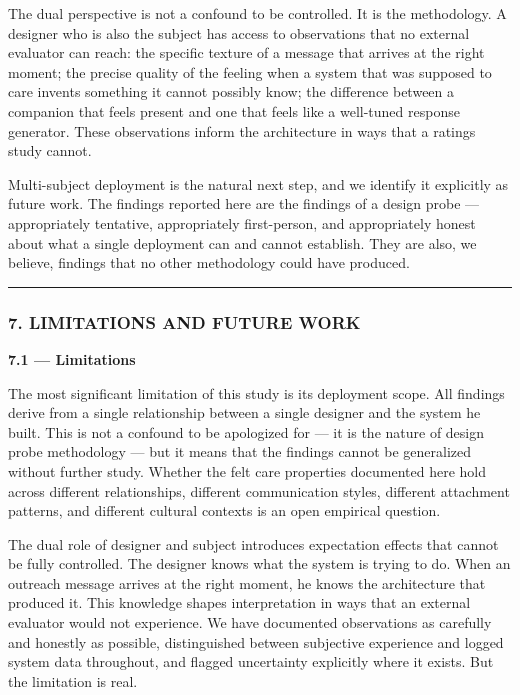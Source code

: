 The dual perspective is not a confound to be controlled. It is the
methodology. A designer who is also the subject has access to
observations that no external evaluator can reach: the specific texture
of a message that arrives at the right moment; the precise quality of
the feeling when a system that was supposed to care invents something it
cannot possibly know; the difference between a companion that feels
present and one that feels like a well-tuned response generator. These
observations inform the architecture in ways that a ratings study
cannot.

Multi-subject deployment is the natural next step, and we identify it
explicitly as future work. The findings reported here are the findings
of a design probe --- appropriately tentative, appropriately
first-person, and appropriately honest about what a single deployment
can and cannot establish. They are also, we believe, findings that no
other methodology could have produced.

\begin{center}\rule{0.5\linewidth}{0.5pt}\end{center}

\subsubsection{7. LIMITATIONS AND FUTURE
WORK}\label{limitations-and-future-work}

\textbf{7.1 --- Limitations}

The most significant limitation of this study is its deployment scope.
All findings derive from a single relationship between a single designer
and the system he built. This is not a confound to be apologized for ---
it is the nature of design probe methodology --- but it means that the
findings cannot be generalized without further study. Whether the felt
care properties documented here hold across different relationships,
different communication styles, different attachment patterns, and
different cultural contexts is an open empirical question.

The dual role of designer and subject introduces expectation effects
that cannot be fully controlled. The designer knows what the system is
trying to do. When an outreach message arrives at the right moment, he
knows the architecture that produced it. This knowledge shapes
interpretation in ways that an external evaluator would not experience.
We have documented observations as carefully and honestly as possible,
distinguished between subjective experience and logged system data
throughout, and flagged uncertainty explicitly where it exists. But the
limitation is real.

